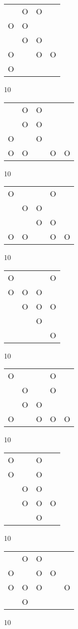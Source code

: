\begin{tabular}{|m{0.2cm}m{0.2cm}m{0.2cm}m{0.2cm}|}\hline
 &O&O& \\
O&O& & \\
 &O&O& \\
O& &O&O\\
O& & & \\
\hline\end{tabular}10
\begin{tabular}{|m{0.2cm}m{0.2cm}m{0.2cm}m{0.2cm}m{0.2cm}|}\hline
 &O&O& & \\
 &O&O& & \\
O& &O& & \\
O&O& &O&O\\
\hline\end{tabular}10
\begin{tabular}{|m{0.2cm}m{0.2cm}m{0.2cm}m{0.2cm}m{0.2cm}|}\hline
O& & &O& \\
 &O&O& & \\
 & &O&O& \\
O&O& &O&O\\
\hline\end{tabular}10
\begin{tabular}{|m{0.2cm}m{0.2cm}m{0.2cm}m{0.2cm}|}\hline
O& & &O\\
O&O&O& \\
 &O&O&O\\
 & &O& \\
 & & &O\\
\hline\end{tabular}10
\begin{tabular}{|m{0.2cm}m{0.2cm}m{0.2cm}m{0.2cm}m{0.2cm}|}\hline
O& & &O& \\
 &O& &O& \\
 &O&O& & \\
O& &O&O&O\\
\hline\end{tabular}10
\begin{tabular}{|m{0.2cm}m{0.2cm}m{0.2cm}m{0.2cm}|}\hline
O& &O& \\
O& &O& \\
 &O&O& \\
 &O&O&O\\
 & &O& \\
\hline\end{tabular}10
\begin{tabular}{|m{0.2cm}m{0.2cm}m{0.2cm}m{0.2cm}m{0.2cm}|}\hline
 &O&O& & \\
O& &O&O& \\
O&O&O& &O\\
 &O& & & \\
\hline\end{tabular}10

